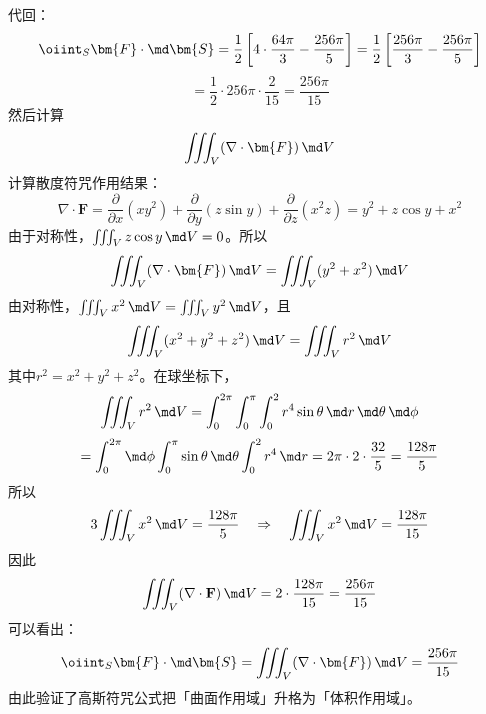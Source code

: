 \begin{example}[向量微分符咒综合应用]
\begin{enumerate}
              代回：
              \begin{equation}
                  \oiint_S \bm{F} \cdot \md\bm{S} = \frac12 \left[ 4 \cdot \frac{64\pi}{3} - \frac{256\pi}{5} \right]
                  = \frac12 \left[ \frac{256\pi}{3} - \frac{256\pi}{5} \right]
              \end{equation}
              \begin{equation}
                  = \frac12 \cdot 256\pi \cdot \frac{2}{15} = \frac{256\pi}{15}
              \end{equation}
              然后计算
              \begin{equation}
                  \iiint_V (\nabla \cdot \bm{F}) \, \md V
              \end{equation}
              计算散度符咒作用结果：
              \begin{equation}
                  \nabla \cdot \bm{F} = \frac{\partial}{\partial x}(xy^2) + \frac{\partial}{\partial y}(z\sin y) + \frac{\partial}{\partial z}(x^2 z) = y^2 + z\cos y + x^2
              \end{equation}
              由于对称性，$\iiint_V z\cos y \, \md V = 0$。所以
              \begin{equation}
                  \iiint_V (\nabla \cdot \bm{F}) \, \md V = \iiint_V (y^2 + x^2) \, \md V
              \end{equation}
              由对称性，$\iiint_V x^2 \, \md V = \iiint_V y^2 \, \md V$，且
              \begin{equation}
                  \iiint_V (x^2 + y^2 + z^2) \, \md V = \iiint_V r^2 \, \md V
              \end{equation}
              其中$r^2 = x^2 + y^2 + z^2$。在球坐标下，
              \begin{equation}
                  \iiint_V r^2 \, \md V = \int_0^{2\pi} \int_0^{\pi} \int_0^2 r^4 \sin\theta \, \md r \, \md\theta \, \md\phi
              \end{equation}
              \begin{equation}
                  = \int_0^{2\pi} \md\phi \int_0^{\pi} \sin\theta \, \md\theta \int_0^2 r^4 \, \md r = 2\pi \cdot 2 \cdot \frac{32}{5} = \frac{128\pi}{5}
              \end{equation}
              所以
              \begin{equation}
                  3 \iiint_V x^2 \, \md V = \frac{128\pi}{5} \quad\Rightarrow\quad \iiint_V x^2 \, \md V = \frac{128\pi}{15}
              \end{equation}
              因此
              \begin{equation}
                  \iiint_V (\nabla \cdot \mathbf{F}) \, \md V = 2 \cdot \frac{128\pi}{15} = \frac{256\pi}{15}
              \end{equation}
              可以看出：
              \begin{equation}
                  \oiint_{S}\bm{F}\cdot\md\bm{S} = \iiint_{V}(\nabla\cdot\bm{F})\,\md V = \frac{256\pi}{15}
              \end{equation}
              由此验证了高斯符咒公式把「曲面作用域」升格为「体积作用域」。


\end{enumerate}
\end{example}
